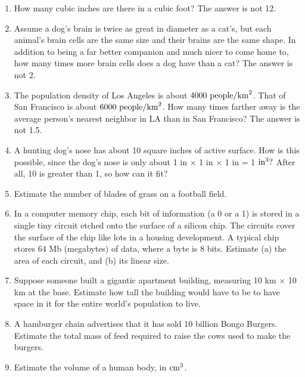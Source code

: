 \begin{enumerate}

\item  How many cubic inches are there in a cubic foot?
The answer is not 12.


\item 
Assume a dog's brain is twice as great in diameter as a
cat's, but each animal's brain cells are the same size and
their brains are the same shape. In addition to being a far
better companion and much nicer to come home to, how many
times more brain cells does a dog have than a cat?
The answer is not 2.

\item
 The population density of Los Angeles is about 
$4000\ \text{people}/\textup{km}^2$. That of San Francisco is about 
$6000\ \text{people}/\zu{km}^2$. How many times farther away is the average
person's nearest neighbor in LA than in San Francisco?
The answer is not 1.5. 

\item 
 A hunting dog's nose has about 10 square inches of active
surface. How is this possible, since the dog's nose is only
about 1 in $\times$ 1 in $\times$ 1 in = 1 $\textup{in}^3?$ After all, 10 is
greater than 1, so how can it fit?

\item 
 Estimate the number of blades of grass on a football field.

\item
 In a computer memory chip, each bit of information (a 0
or a 1) is stored in a single tiny circuit etched onto the
surface of a silicon chip. The circuits cover the surface of
the chip like lots in a housing development. A typical chip
stores 64 Mb (megabytes) of data, where a byte is 8 bits.
Estimate (a) the area of each circuit, and (b) its linear size.


\item  Suppose someone built a gigantic apartment building,
measuring 10 km $\times$ 10 km at the base. Estimate how tall the
building would have to be to have space in it for the entire
world's population to live.

\item 
 A hamburger chain advertises that it has sold 10 billion
Bongo Burgers. Estimate the total mass of feed required to
raise the cows used to make the burgers.

\item 
 Estimate the volume of a human body, in $\textup{cm}^3$.


\end{enumerate}
